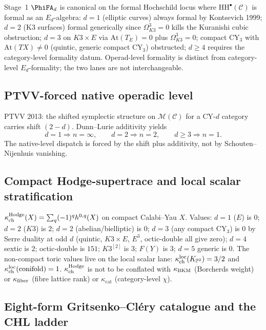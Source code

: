 Stage~1 $\PhiFA_d$ is canonical on the formal Hochschild locus where
$\mathrm{HH}^{\bullet}(\mathcal C)$ is formal as an $E_d$-algebra:
$d=1$ (elliptic curves) always formal by Kontsevich 1999; $d=2$ (K3
surfaces) formal generically since $\Omega^3_{K3}=0$ kills the
Kuranishi cubic obstruction; $d=3$ on $K3\times E$ via
$\mathrm{At}(T_E)=0$ plus $\Omega^3_{K3}=0$; compact CY$_3$ with
$\mathrm{At}(TX)\ne 0$ (quintic, generic compact CY$_3$) obstructed;
	$d\ge 4$ requires the category-level formality datum. Operad-level formality is distinct
from category-level $E_d$-formality; the two lanes are not
interchangeable.

\subsection{PTVV-forced native operadic level}
\label{subsec:v3-intro-ptvv-forced}

PTVV 2013: the shifted symplectic structure on $\mathcal M(\mathcal C)$
for a CY-$d$ category carries shift $(2-d)$. Dunn--Lurie additivity
yields
\[
 d=1 \Rightarrow n=\infty,\qquad
 d=2 \Rightarrow n=2,\qquad
 d\ge 3 \Rightarrow n=1.
\]
The native-level dispatch is forced by the shift plus additivity, not
by Schouten--Nijenhuis vanishing.

\subsection{Compact Hodge-supertrace and local scalar stratification}
\label{subsec:v3-intro-kappa-ch-hodge}

$\kappa_{\mathrm{ch}}^{\mathrm{Hodge}}(X) = \sum_q (-1)^q h^{0,q}(X)$ on compact
Calabi--Yau $X$. Values: $d=1$ ($E$) is $0$; $d=2$ ($K3$) is $2$;
$d=2$ (abelian/bielliptic) is $0$; $d=3$ (any compact CY$_3$) is $0$
by Serre duality at odd $d$ (quintic, $K3\times E$, $E^3$,
octic-double all give zero); $d=4$ sextic is $2$; octic-double is
$151$; $K3^{[2]}$ is $3$; $F(Y)$ is $3$; $d=5$ generic is $0$.
The non-compact toric values live on the local scalar lane:
$\kappa_{\mathrm{ch}}^{\mathrm{loc}}(K_{\mathbb P^2})=3/2$ and
$\kappa_{\mathrm{ch}}^{\mathrm{loc}}(\mathrm{conifold})=1$. $\kappa_{\mathrm{ch}}^{\mathrm{Hodge}}$
is not to be conflated with $\kappa_{\mathrm{BKM}}$ (Borcherds weight) or
$\kappa_{\mathrm{fiber}}$ (fibre lattice rank) or $\kappa_{\mathrm{cat}}$
(category-level $\chi$).

\subsection{Eight-form Gritsenko--Cl\'ery catalogue and the CHL ladder}
\label{subsec:v3-intro-eight-form}

